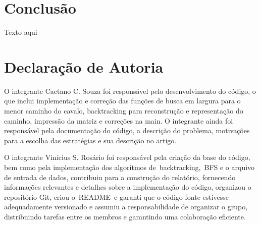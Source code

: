 \documentclass[relatorio]{IEEEtran}
\begin{document}
\section{Conclusão}
Texto aqui

\section{Declaração de Autoria}
O integrante Caetano C. Souza foi responsável pelo desenvolvimento do código, o que inclui implementação e correção das funções de busca em largura para o menor caminho do cavalo, backtracking para reconstrução e representação do caminho, impressão da matriz e correções na main. O integrante ainda foi responsável pela documentação do código, a descrição do problema, motivações para a escolha das estratégias e sua descrição no artigo. 

O integrante Vinícius S. Rosário foi responsável pela criação da base do código, bem como pela implementação dos algoritmos de backtracking, BFS e o arquivo de entrada de dados, contribuiu para a construção do relatório, fornecendo informações relevantes e detalhes sobre a implementação do código, organizou o repositório Git, criou o README e garanti que o código-fonte estivesse adequadamente versionado e assumiu a responsabilidade de organizar o grupo, distribuindo tarefas entre os membros e garantindo uma colaboração eficiente.
\end{document}
